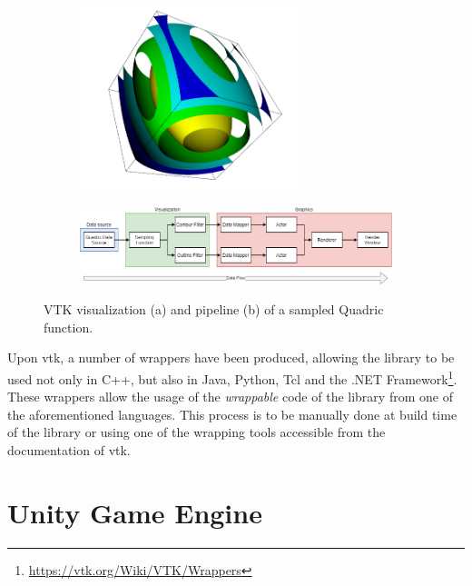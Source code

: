 \begin{figure}[t]
    \centering
    \begin{subfigure}{\textwidth}
        \centering
        \includegraphics[width=0.7\textwidth]{pictures/Quadric-Rendering.PNG}
        \caption{}
    \end{subfigure}
    \begin{subfigure}{\textwidth}
        \includegraphics[width=\textwidth]{pictures/Pipeline-VTK-Quadric.png}
        \caption{}
    \end{subfigure}
    \caption{VTK visualization (a) and pipeline (b) of a sampled Quadric function.}
    \label{fig:quadric-render-pipeline}
\end{figure}

Upon \acrshort{vtk}, a number of wrappers have been produced, allowing the library to be used not only in C++, but also in Java, Python, Tcl and the .NET Framework\footnote{\url{https://vtk.org/Wiki/VTK/Wrappers}}. These wrappers allow the usage of the \textit{wrappable} code of the library from one of the aforementioned languages. This process is to be manually done at build time of the library or using one of the wrapping tools accessible from the documentation of \acrshort{vtk}.

\section{Unity Game Engine}

